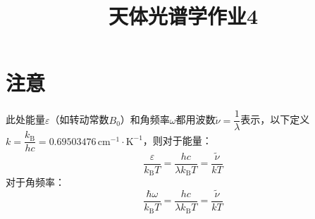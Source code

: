 \documentclass[a4paper]{article}
\renewcommand\epsilon\varepsilon
\begin{document}
\title{\textbf{天体光谱学作业4}}
\author{}
\date{}
\maketitle

\section*{注意}

此处能量$\epsilon$（如转动常数$B_0$）和角频率$\omega$都用波数$\tilde{\nu}=\dfrac{1}{\lambda}$表示，以下定义$k=\dfrac{k_\mathrm{B}}{hc}=0.69503476\,\mathrm{cm^{-1}\cdot K^{-1}}$，则对于能量：
\[
    \frac{\epsilon}{k_\mathrm{B}T} = \frac{hc}{\lambda k_\mathrm{B}T} = \frac{\tilde{\nu}}{kT}
\]
对于角频率：
\[
    \frac{\hbar\omega}{k_\mathrm{B}T} = \frac{hc}{\lambda k_\mathrm{B}T} = \frac{\tilde{\nu}}{kT}
\]
\bigskip
\end{document}
